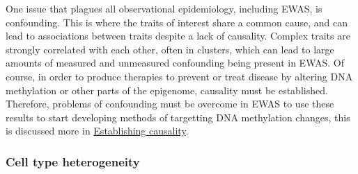 \documentclass[11pt,twoside]{bristolthesis}
\begin{document}
One issue that plagues all observational epidemiology, including EWAS, is confounding. This is where the traits of interest share a common cause, and can lead to associations between traits despite a lack of causality. Complex traits are strongly correlated with each other, often in clusters, which can lead to large amounts of measured and unmeasured confounding being present in EWAS. Of course, in order to produce therapies to prevent or treat disease by altering DNA methylation or other parts of the epigenome, causality must be established. Therefore, problems of confounding must be overcome in EWAS to use these results to start developing methods of targetting DNA methylation changes, this is discussed more in \protect\hyperlink{establishing-causality}{Establishing causality}.

\hypertarget{cell-type-heterogeneity}{%
\subsubsection{Cell type heterogeneity}\label{cell-type-heterogeneity}}
\end{document}
